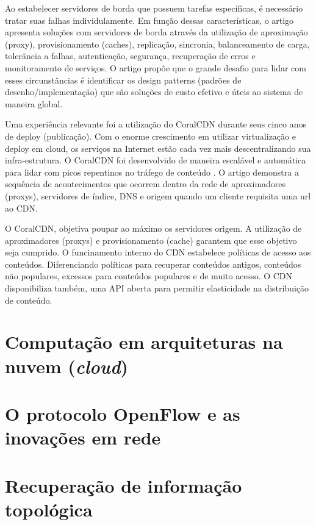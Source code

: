 Ao estabelecer servidores de borda que possuem tarefas específicas, 
é necessário tratar suas falhas individulamente.
Em função dessas características, o artigo apresenta soluções com servidores de
borda através da utilização de aproximação (proxy), provisionamento (caches), 
replicação, sincronia, balanceamento de carga, tolerância a falhas, 
autenticação, segurança, recuperação de erros e monitoramento de serviços. 
O artigo propôe que o grande desafio para lidar com esses circunstâncias é 
identificar os design patterns (padrões de desenho/implementação) que são 
soluções de custo efetivo e úteis ao sistema de maneira global.


Uma experiência relevante foi a utilização do CoralCDN durante seus cinco
anos de deploy (publicação).
Com o enorme crescimento em utilizar virtualização e deploy em cloud, 
os serviços na Internet estão cada vez mais descentralizando
sua infra-estrutura. 
O CoralCDN foi desenvolvido de maneira escalável e automática para lidar com 
picos repentinos no tráfego de conteúdo \citep{freedman2010experiences}. 
O artigo demonstra a sequência de acontecimentos que ocorrem dentro da rede de 
aproximadores (proxys), servidores de índice, DNS e origem quando um cliente 
requisita uma url ao CDN. 

O CoralCDN, objetiva poupar ao máximo os servidores origem. 
A utilização de aproximadores (proxys) e provisionamento (cache) 
garantem que esse objetivo seja cumprido. 
O funcinamento interno do CDN estabelece políticas de acesso aos conteúdos. 
Diferenciando políticas para recuperar conteúdos antigos, conteúdos não 
populares, excessos para conteúdos populares e de muito acesso. O CDN 
disponibiliza também, uma API aberta para permitir elasticidade na 
distribuição de conteúdo. 

\section{Computação em arquiteturas na nuvem (\emph{cloud})}

\section{O protocolo OpenFlow e as inovações em rede}

\section{Recuperação de informação topológica}


